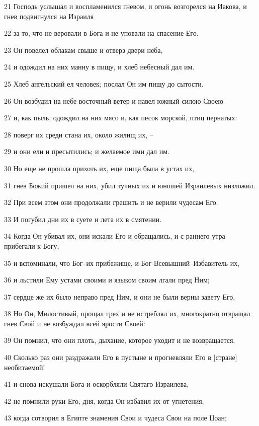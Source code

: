 \par 21 Господь услышал и воспламенился гневом, и огонь возгорелся на Иакова, и гнев подвигнулся на Израиля
\par 22 за то, что не веровали в Бога и не уповали на спасение Его.
\par 23 Он повелел облакам свыше и отверз двери неба,
\par 24 и одождил на них манну в пищу, и хлеб небесный дал им.
\par 25 Хлеб ангельский ел человек; послал Он им пищу до сытости.
\par 26 Он возбудил на небе восточный ветер и навел южный силою Своею
\par 27 и, как пыль, одождил на них мясо и, как песок морской, птиц пернатых:
\par 28 поверг их среди стана их, около жилищ их, --
\par 29 и они ели и пресытились; и желаемое ими дал им.
\par 30 Но еще не прошла прихоть их, еще пища была в устах их,
\par 31 гнев Божий пришел на них, убил тучных их и юношей Израилевых низложил.
\par 32 При всем этом они продолжали грешить и не верили чудесам Его.
\par 33 И погубил дни их в суете и лета их в смятении.
\par 34 Когда Он убивал их, они искали Его и обращались, и с раннего утра прибегали к Богу,
\par 35 и вспоминали, что Бог--их прибежище, и Бог Всевышний--Избавитель их,
\par 36 и льстили Ему устами своими и языком своим лгали пред Ним;
\par 37 сердце же их было неправо пред Ним, и они не были верны завету Его.
\par 38 Но Он, Милостивый, прощал грех и не истреблял их, многократно отвращал гнев Свой и не возбуждал всей ярости Своей:
\par 39 Он помнил, что они плоть, дыхание, которое уходит и не возвращается.
\par 40 Сколько раз они раздражали Его в пустыне и прогневляли Его в [стране] необитаемой!
\par 41 и снова искушали Бога и оскорбляли Святаго Израилева,
\par 42 не помнили руки Его, дня, когда Он избавил их от угнетения,
\par 43 когда сотворил в Египте знамения Свои и чудеса Свои на поле Цоан;
